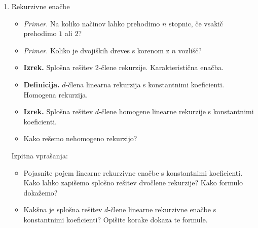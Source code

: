 \begin{enumerate}
    \item Rekurzivne enačbe
    \begin{itemize}
        \item \colorbox{yellow!30}{\emph{Primer.}} Na koliko načinov lahko prehodimo \(n\) stopnic, če vsakič prehodimo \(1\) ali \(2\)?
        \item \colorbox{yellow!30}{\emph{Primer.}} Koliko je dvojiških dreves s korenom z $n$ vozlišč?
        \item \colorbox{blue!30}{\textbf{Izrek.}} Splošna rešitev 2-člene rekurzije. Karakteristična enačba.
        \item \colorbox{purple!30}{\textbf{Definicija.}} \(d\)-člena linearna rekurzija s konstantnimi koeficienti. Homogena rekurzija.
        \item \colorbox{blue!30}{\textbf{Izrek.}} Splošna rešitev \(d\)-člene homogene linearne rekurzije s konstantnimi koeficienti.
        \item Kako rešemo nehomogeno rekurzijo?
    \end{itemize}

    Izpitna vprašanja:
    \begin{itemize}
        \item Pojasnite pojem linearne rekurzivne enačbe s konstantnimi koeficienti. Kako lahko zapišemo splošno rešitev dvočlene rekurzije? Kako formulo dokažemo?
        \item Kakšna je splošna rešitev \(d\)-člene linearne rekurzivne enačbe s konstantnimi koeficienti? Opišite korake dokaza te formule.
    \end{itemize}


\end{enumerate}
